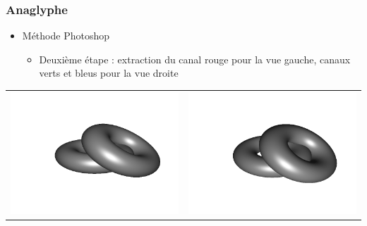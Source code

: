\documentclass{beamer}
\begin{document}
%
\begin{frame}
\frametitle{Anaglyphe}
\begin{itemize}[label=$\bullet$]
\item Méthode Photoshop \cite{stereoAnaglyph}
	\begin{itemize}[label=$\circ$]
	\item Deuxième étape : extraction du canal rouge pour la vue gauche, canaux verts et bleus pour la vue droite 
	\end{itemize}
\end{itemize}
\begin{tabular}{l|r}
\includegraphics[scale=0.15]{flip1.png}
&
\includegraphics[scale=0.15]{flip2.png}
\end{tabular}

\end{frame}
\end{document}
